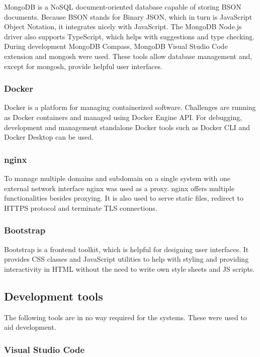 MongoDB is a NoSQL document-oriented database capable of storing BSON documents. Because BSON stands for Binary JSON, which in turn is JavaScript Object Notation, it integrates nicely with JavaScript. The MongoDB Node.js driver also supports TypeScript, which helps with suggestions and type checking.\\
During development MongoDB Compass, MongoDB Visual Studio Code extension and mongosh were used. These tools allow database management and, except for mongosh, provide helpful user interfaces.

\subsubsection{Docker}

Docker is a platform for managing containerized software. Challenges are running as Docker containers and managed using Docker Engine API. For debugging, development and management standalone Docker tools such as Docker CLI and Docker Desktop can be used.

\subsubsection{nginx}

To manage multiple domains and subdomain on a single system with one external network interface nginx was used as a proxy. nginx offers multiple functionalities besides proxying. It is also used to serve static files, redirect to HTTPS protocol and terminate TLS connections.

\subsubsection{Bootstrap}

Bootstrap is a frontend toolkit, which is helpful for designing user interfaces. It provides CSS classes and JavaScript utilities to help with styling and providing interactivity in HTML without the need to write own style sheets and JS scripts.

\subsection{Development tools}

The following tools are in no way required for the systems. These were used to aid development.

\subsubsection{Visual Studio Code}

